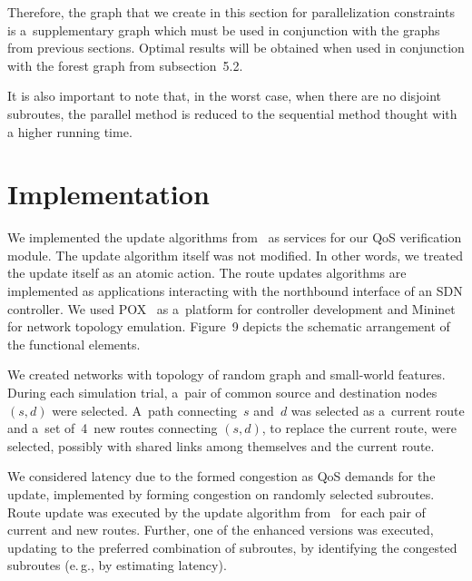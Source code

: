 \begin{multicols}{2}
Therefore, the graph that we create in this section for parallelization constraints 
is a~supplementary graph which must be used in conjunction with the graphs from 
previous sections. Optimal results will be obtained when used in conjunction with 
the forest graph from subsection~5.2.

It is also important to note that, in the worst case, when there are 
no disjoint subroutes, the parallel method is reduced to the sequential 
method thought with a higher running time.

\vspace*{-12pt} 


\section{Implementation}

\noindent
We implemented the update algorithms from~\cite{delaet_seamless_2015} as 
services for our QoS verification module. The update algorithm itself 
was not modified. In other words, we treated the update itself as 
an atomic action. The route updates
 algorithms are implemented as 
applications interacting with the northbound interface of an SDN controller. 
We used POX~\cite{kaur_network_2014} as a~platform for controller development and 
Mininet~\cite{lantz_network_2010} for network topology emulation. 
Figure~9 depicts the schematic arrangement of the 
functional elements. 



We created networks with topology of random graph and small-world features. 
During each simulation trial, a~pair of common source and destination nodes $(s,d)$ 
were selected. A~path connecting~$s$ and~$d$ was selected as a~current route and 
a~set of~4~new routes connecting $(s,d)$, to replace the current route, were 
selected, possibly with shared links among themselves and the current route. 

We considered latency due to the formed congestion as QoS demands for the update, 
implemented by forming congestion on randomly selected subroutes. Route 
update was executed by the update algorithm from~\cite{delaet_seamless_2015} for 
each pair of current and new routes. Further, one of the enhanced versions 
was executed, updating to the
 preferred combination of subroutes, by identifying 
the congested subroutes (e.\,g., by estimating latency).

{ \begin{center}  %
\vspace*{8pt}
  \mbox{%
 \epsfxsize=58.544mm 
 }


\end{center}}
\end{multicols}
